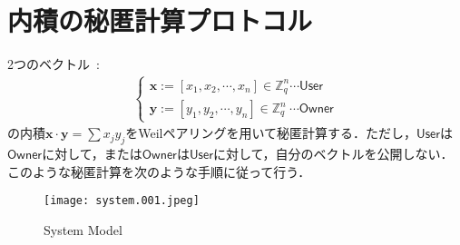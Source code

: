 \documentclass[a4paper]{jsarticle}
\begin{document}
\section{内積の秘匿計算プロトコル}
2つのベクトル\ :\ 
\begin{align}
\begin{cases}
\bm{x}:=[x_1, x_2, \cdots, x_n]\in \mathbb{Z}^n_q \cdots \mathsf{User}\\
\bm{y}:=[y_1, y_2, \cdots, y_n]\in \mathbb{Z}^n_q \ \cdots \mathsf{Owner}
\end{cases}
\end{align}
の内積$\bm{x}\cdot \bm{y} = \sum x_j y_j$をWeilペアリングを用いて秘匿計算する．ただし，$\mathsf{User}$は$\mathsf{Owner}$に対して，または$\mathsf{Owner}$は$\mathsf{User}$に対して，自分のベクトルを公開しない．このような秘匿計算を次のような手順に従って行う．
\begin{figure}[!h]
  \begin{center}
   \texttt{[image: system.001.jpeg]}
  \end{center}
  \caption{System Model}
  \label{SM} %
\end{figure}
\end{document}
